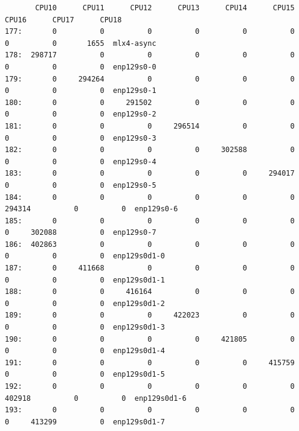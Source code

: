 \begin{landscape}
\vspace*{\fill}
\begin{lstlisting}
       CPU10      CPU11      CPU12      CPU13      CPU14      CPU15      CPU16      CPU17      CPU18
177:       0          0          0          0          0          0          0          0       1655  mlx4-async
178:  298717          0          0          0          0          0          0          0          0  enp129s0-0
179:       0     294264          0          0          0          0          0          0          0  enp129s0-1
180:       0          0     291502          0          0          0          0          0          0  enp129s0-2
181:       0          0          0     296514          0          0          0          0          0  enp129s0-3
182:       0          0          0          0     302588          0          0          0          0  enp129s0-4
183:       0          0          0          0          0     294017          0          0          0  enp129s0-5
184:       0          0          0          0          0          0     294314          0          0  enp129s0-6
185:       0          0          0          0          0          0          0     302088          0  enp129s0-7
186:  402863          0          0          0          0          0          0          0          0  enp129s0d1-0
187:       0     411668          0          0          0          0          0          0          0  enp129s0d1-1
188:       0          0     416164          0          0          0          0          0          0  enp129s0d1-2
189:       0          0          0     422023          0          0          0          0          0  enp129s0d1-3
190:       0          0          0          0     421805          0          0          0          0  enp129s0d1-4
191:       0          0          0          0          0     415759          0          0          0  enp129s0d1-5
192:       0          0          0          0          0          0     402918          0          0  enp129s0d1-6
193:       0          0          0          0          0          0          0     413299          0  enp129s0d1-7
\end{lstlisting}
\vspace*{\fill}
\end{landscape}


